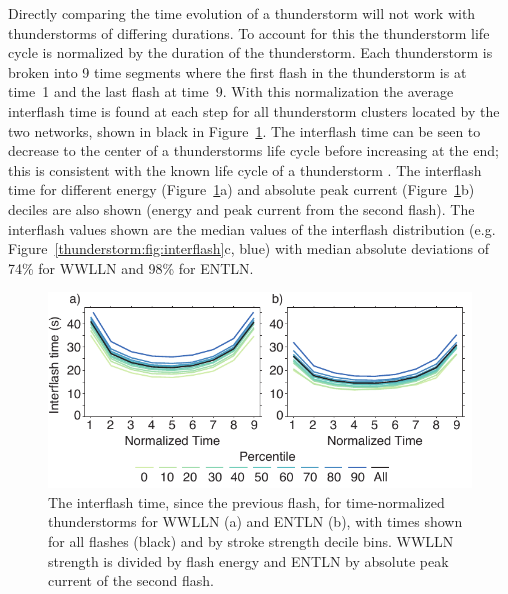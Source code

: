 Directly comparing the time evolution of a thunderstorm will not work with thunderstorms of differing durations.
To account for this the thunderstorm life cycle is normalized by the duration of the thunderstorm.
Each thunderstorm is broken into 9 time segments where the first flash in the thunderstorm is at time~1 and the last flash at time~9.
With this normalization the average interflash time is found at each step for all thunderstorm clusters located by the two networks, shown in black in Figure~\ref{thunderstorm:fig:timerate}.
The interflash time can be seen to decrease to the center of a thunderstorms life cycle before increasing at the end; this is consistent with the known life cycle of a thunderstorm \citep{Peckham1984,Rakov2003}.
The interflash time for different energy (Figure~\ref{thunderstorm:fig:timerate}a) and absolute peak current (Figure~\ref{thunderstorm:fig:timerate}b) deciles are also shown (energy and peak current from the second flash).
The interflash values shown are the median values of the interflash distribution (e.g. Figure~\ref{thunderstorm:fig:interflash}c, blue) with median absolute deviations of 74\% for WWLLN and 98\% for ENTLN.

\begin{figure}[ht!]
   \centering
   \includegraphics[scale=1]{thunderstorm/Figures/stormTimeRate.pdf}
   \caption{The interflash time, since the previous flash, for time-normalized thunderstorms for WWLLN (a) and ENTLN (b), with times shown for all flashes (black) and by stroke strength decile bins.
     WWLLN strength is divided by flash energy and ENTLN by absolute peak current of the second flash.}
   \label{thunderstorm:fig:timerate}
\end{figure}

